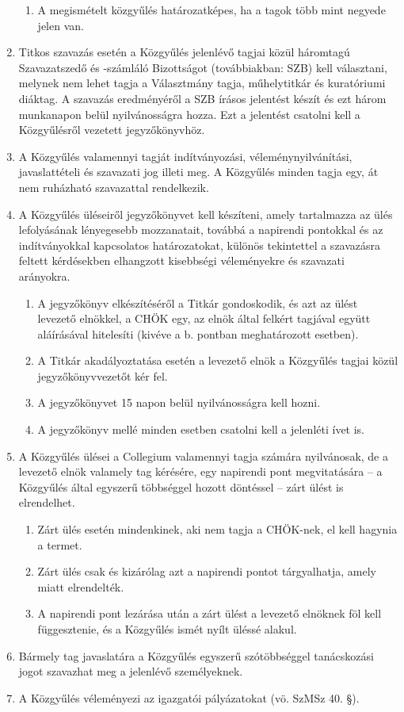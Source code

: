 \documentclass{../styles/rulebook}
\begin{document}
\begin{enumerate}
\begin{enumerate}
		\item A megismételt közgyűlés határozatképes, ha a tagok több mint negyede jelen van.
	\end{enumerate}
	\item Titkos szavazás esetén a Közgyűlés jelenlévő tagjai közül háromtagú Szavazatszedő és -számláló Bizottságot (továbbiakban: SZB) kell választani, melynek nem lehet tagja a Választmány tagja, műhelytitkár és kuratóriumi diáktag. A szavazás eredményéről a SZB írásos jelentést készít és ezt három munkanapon belül nyilvánosságra hozza. Ezt a jelentést csatolni kell a Közgyűlésről vezetett jegyzőkönyvhöz.
	\item A Közgyűlés valamennyi tagját indítványozási, véleménynyilvánítási, javaslattételi és szavazati jog illeti meg. A Közgyűlés minden tagja egy, át nem ruházható szavazattal rendelkezik.
	\item A Közgyűlés üléseiről jegyzőkönyvet kell készíteni, amely tartalmazza az ülés lefolyásának lényegesebb mozzanatait, továbbá a napirendi pontokkal és az indítványokkal kapcsolatos határozatokat, különös tekintettel a szavazásra feltett kérdésekben elhangzott kisebbségi véleményekre és szavazati arányokra.
	\begin{enumerate}
		\item A jegyzőkönyv elkészítéséről a Titkár gondoskodik, és azt az ülést levezető elnökkel, a CHÖK egy, az elnök által felkért tagjával együtt aláírásával hitelesíti (kivéve a b. pontban meghatározott esetben).
		\item A Titkár akadályoztatása esetén a levezető elnök a Közgyűlés tagjai közül jegyzőkönyvvezetőt kér fel.
		\item A jegyzőkönyvet 15 napon belül nyilvánosságra kell hozni.
		\item A jegyzőkönyv mellé minden esetben csatolni kell a jelenléti ívet is.
	\end{enumerate}
	\item A Közgyűlés ülései a Collegium valamennyi tagja számára nyilvánosak, de a levezető elnök valamely tag kérésére, egy napirendi pont megvitatására – a Közgyűlés által egyszerű többséggel hozott döntéssel – zárt ülést is elrendelhet.
	\begin{enumerate}
		\item Zárt ülés esetén mindenkinek, aki nem tagja a CHÖK-nek, el kell hagynia a termet.
		\item Zárt ülés csak és kizárólag azt a napirendi pontot tárgyalhatja, amely miatt elrendelték.
		\item A napirendi pont lezárása után a zárt ülést a levezető elnöknek föl kell függesztenie, és a Közgyűlés ismét nyílt üléssé alakul.
	\end{enumerate}
	\item Bármely tag javaslatára a Közgyűlés egyszerű szótöbbséggel tanácskozási jogot szavazhat meg a jelenlévő személyeknek.
	\item A Közgyűlés véleményezi az igazgatói pályázatokat (vö. SzMSz 40. §).
\end{enumerate}
\end{document}
